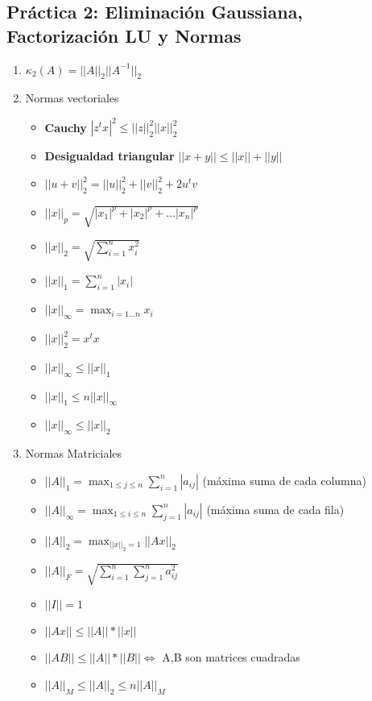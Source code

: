 \subsection*{Práctica 2: Eliminación Gaussiana, Factorización LU y Normas}
\begin{enumerate}
    \item $\kappa_2(A) = ||A||_2 ||A^{-1}||_2$
    
    \item Normas vectoriales
    \begin{itemize}
        \item \textbf{Cauchy} $|z^tx|^2 \leq ||z||_2^2 ||x||_2^2$
         \item \textbf{Desigualdad triangular} $||x+y|| \leq ||x||+||y||$
         \item $||u+v||_2^2 = ||u||_2^2+||v||_2^2 + 2u^tv$
         \item $||x||_p = \sqrt{|x_1|^p+|x_2|^p+\dots |x_n|^p}$
        \item $||x||_2 = \sqrt{\sum_{i=1}^{n} x_i^2}$
        \item $||x||_1 = \sum_{i=1}^{n} |x_i|$
        \item $||x||_{\infty}  = \max_{i=1 \dots n} x_i$
        \item $||x||_2^2 = x^tx$
        \item $||x||_{\infty} \leq ||x||_1$
        \item $||x||_1 \leq n ||x||_{\infty}$
        \item $||x||_{\infty} \leq ||x||_2$
    \end{itemize}
    
    \item Normas Matriciales
    \begin{itemize}
         \item $||A||_1 = \max_{1\leq j\leq n} \sum_{i=1}^{n} |a_{ij}|$ (máxima suma de cada columna)
          \item $||A||_{\infty} = \max_{1\leq i\leq n} \sum_{j=1}^{n} |a_{ij}|$ (máxima suma de cada fila)
         \item $||A||_2 = \max_{||x||_2=1} ||Ax||_2$
         \item $||A||_F = \sqrt{\sum_{i=1}^{n} \sum_{j=1}^{n} a_{ij}^2}$
        \item $||I|| = 1$
        \item $||Ax|| \leq ||A||*||x||$
        \item $||AB|| \leq ||A||*||B|| \iff$ A,B son matrices cuadradas
        \item $||A||_M \leq ||A||_2 \leq n ||A||_M$
    \end{itemize}
    

\end{enumerate}
